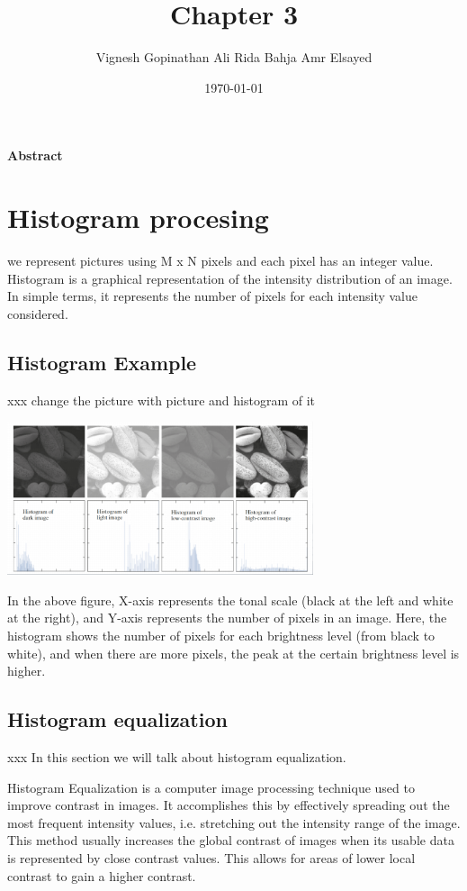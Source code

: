 \documentclass[a4paper]{article}
\affiliation{<Your school, think tank, etc>}
\author{Vignesh Gopinathan Ali Rida Bahja Amr Elsayed}
\date{\today}
\title{Chapter 3}
\begin{document}
\maketitle
\tableofcontents

\begin{ABSTRACT}
\textbf{Abstract}
\end{ABSTRACT}
\tableofcontents
\section{Histogram procesing}
\label{sec:orgaa70f41}
we represent pictures using M x N pixels and each pixel has an integer value.
Histogram is a graphical representation of the intensity distribution of an image.
In simple terms, it represents the number of pixels for each intensity value considered.
\subsection{Histogram Example}
\label{sec:org0b3cc87}
xxx change the picture with picture and histogram of it
\begin{center}
\includegraphics[angle=0,width=9cm]{./img/histogram_example.png}
\end{center}
In the above figure, X-axis represents the tonal scale (black at the left and white at the right),
and Y-axis represents the number of pixels in an image. Here,
the histogram shows the number of pixels for each brightness level (from black to white),
and when there are more pixels, the peak at the certain brightness level is higher.

\subsection{Histogram equalization}
\label{sec:orgc969886}
xxx In this section we will talk about histogram equalization.

Histogram Equalization is a computer image processing technique used to improve contrast in images.
It accomplishes this by effectively spreading out the most frequent intensity values,
i.e. stretching out the intensity range of the image.
This method usually increases the global contrast of images when its usable data is represented by close contrast values.
This allows for areas of lower local contrast to gain a higher contrast.
\end{document}
